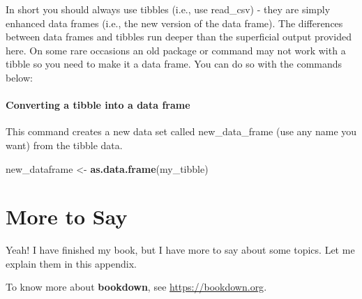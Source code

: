\documentclass[
]{krantz}
\makeatletter
\newenvironment{Shaded}{\begin{snugshade}}{\end{snugshade}}
\newcommand{\KeywordTok}[1]{\textcolor[rgb]{0.27,0.27,0.27}{\textbf{#1}}}
\newcommand{\NormalTok}[1]{#1}
\newcommand{\StringTok}[1]{\textcolor[rgb]{0.5,0.5,0.5}{#1}}
\newenvironment{kframe}{%
\medskip{}
\setlength{\fboxsep}{.8em}
 \def\at@end@of@kframe{}%
 \ifinner\ifhmode%
  \def\at@end@of@kframe{\end{minipage}}%
  \begin{minipage}{\columnwidth}%
 \fi\fi%
 \def\FrameCommand##1{\hskip\@totalleftmargin \hskip-\fboxsep
 \colorbox{shadecolor}{##1}\hskip-\fboxsep
     \hskip-\linewidth \hskip-\@totalleftmargin \hskip\columnwidth}%
 \MakeFramed {\advance\hsize-\width
   \@totalleftmargin\z@ \linewidth\hsize
   \@setminipage}}%
 {\par\unskip\endMakeFramed%
 \at@end@of@kframe}
\renewenvironment{Shaded}{\begin{kframe}}{\end{kframe}}
\makeatother
\begin{document}
In short you should always use tibbles (i.e., use read\_csv) - they are simply enhanced data frames (i.e., the new version of the data frame). The differences between data frames and tibbles run deeper than the superficial output provided here. On some rare occasions an old package or command may not work with a tibble so you need to make it a data frame. You can do so with the commands below:

\hypertarget{converting-a-tibble-into-a-data-frame}{%
\subsubsection{Converting a tibble into a data frame}\label{converting-a-tibble-into-a-data-frame}}

This command creates a new data set called new\_data\_frame (use any name you want) from the tibble data.

\begin{Shaded}
\begin{Highlighting}[]
\NormalTok{new_dataframe <-}\StringTok{ }\KeywordTok{as.data.frame}\NormalTok{(my_tibble)}
\end{Highlighting}
\end{Shaded}

\cleardoublepage

\hypertarget{appendix-appendix}{%
\appendix {}}


\hypertarget{more-to-say}{%
\chapter{More to Say}\label{more-to-say}}

Yeah! I have finished my book, but I have more to say about some topics. Let me explain them in this appendix.

To know more about \textbf{bookdown}, see \url{https://bookdown.org}.

  

\backmatter
\printindex
\end{document}

